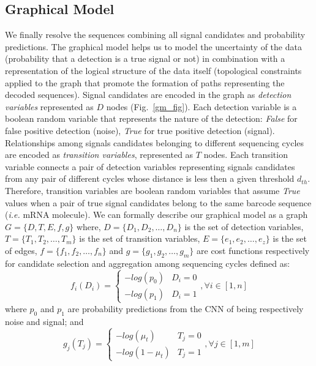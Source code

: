 \documentclass[10pt,journal]{IEEEtran}
\begin{document}
\subsection{Graphical Model}
We finally resolve the sequences combining all signal candidates and probability predictions. The graphical model helps us to model the uncertainty of the data (probability that a detection is a true signal or not) in combination with a representation of the logical structure of the data itself (topological constraints applied to the graph that promote the formation of paths representing the decoded sequences).
Signal candidates are encoded in the graph as \textit{detection variables} represented as \(D\) nodes (Fig.~\ref{gm_fig}). Each detection variable is a boolean random variable that represents the nature of the detection: \textit{False} for false positive detection (noise), \textit{True} for true positive detection (signal). Relationships among signals candidates belonging to different sequencing cycles are encoded as \textit{transition variables}, represented as \(T\) nodes. Each transition variable connects a pair of detection variables representing signals candidates from any pair of different cycles whose distance is less then a given threshold \(d_{th}\). Therefore, transition variables are boolean random variables that assume \textit{True} values when a pair of true signal candidates belong to the same barcode sequence (\textit{i.e.} mRNA molecule).
We can formally describe our graphical model as a graph \(G=\{D,T,E,f,g\}\) where, \(D=\{D_1,D_2,\dots,D_n\}\) is the set of detection variables, \(T=\{T_1, T_2,\dots,T_m\}\) is the set of transition variables, \(E =\{e_1,e_2,\dots,e_z\}\) is the set of edges, \(f=\{f_1,f_2,\dots,f_n\}\) and \(g=\{g_1,g_2,\dots,g_m\}\) are cost functions respectively for candidate selection and aggregation among sequencing cycles defined as:
\begin{equation}
f_i(D_i)=\left\{%
    \begin{array}{lc}
         -log(p_0) & D_i=0 \\
         -log(p_1) & D_i=1
    \end{array}\right., \forall i \in[1,n]
\end{equation}
where $p_0$ and $p_1$ are probability predictions from the CNN of being respectively noise and signal; and
\begin{equation}
g_j(T_j)=\left\{%
    \begin{array}{lc}
         -log(\mu_t) & T_j=0 \\
         -log(1-\mu_t) & T_j=1
    \end{array}\right., \forall j \in[1,m]
\end{equation}
\end{document}
